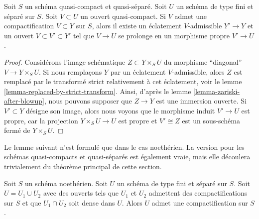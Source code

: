 \begin{lemma}
\label{lemma-compactification-dominates}
Soit $S$ un schéma quasi-compact et quasi-séparé. Soit $U$ un
schéma de type fini et séparé sur $S$. Soit $V \subset U$ un
ouvert quasi-compact. Si $V$ admet une compactification $V \subset Y$
sur $S$, alors il existe un éclatement $V$-admissible $Y' \to Y$ et un
ouvert $V \subset V' \subset Y'$ tel que $V \to U$
se prolonge en un morphisme propre $V' \to U$.
\end{lemma}

\begin{proof}
Considérons l'image schématique $Z \subset Y \times_S U$
du morphisme ``diagonal'' $V \to Y \times_S U$. Si nous remplaçons
$Y$ par un éclatement $V$-admissible, alors $Z$ est remplacé par
le transformé strict relativement à cet éclatement, voir
le lemme \ref{lemma-replaced-by-strict-transform}. Ainsi, d'après
le lemme \ref{lemma-zariski-after-blowup}, nous pouvons supposer que $Z \to Y$
est une immersion ouverte. Si $V' \subset Y$ désigne son image, alors nous
voyons que le morphisme induit $V' \to U$ est propre, car la
projection $Y \times_S U \to U$ est propre et $V' \cong Z$
est un sous-schéma fermé de $Y \times_S U$.
\end{proof}

\noindent
Le lemme suivant n'est formulé que dans le cas noethérien.
La version pour les schémas quasi-compacts et quasi-séparés est
également vraie, mais elle découlera trivialement du théorème principal
de cette section.

\begin{lemma}
\label{lemma-two-compactifications}
Soit $S$ un schéma noethérien. Soit $U$ un schéma de type fini
et séparé sur $S$. Soit $U = U_1 \cup U_2$ avec des ouverts tels que
$U_1$ et $U_2$ admettent des compactifications sur $S$ et que
$U_1 \cap U_2$ soit dense dans $U$. Alors $U$ admet une compactification sur $S$.
\end{lemma}

